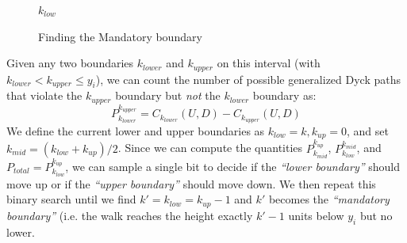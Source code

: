 \begin{figure}
\vspace{-3.0em}
\begin{framed}
    \renewcommand\figurename{Algorithm}
    \caption{Finding the Mandatory boundary}
    \label{alg:mandatory_boundary}
    \begin{algorithmic}[1]
                \vspace{.3em}
                \vspace{.3em}
                \vspace{.3em}
                \vspace{.3em}
            \EndWhile
            \State \Return $k_{low}$
        \EndFunction
    \end{algorithmic}
\end{framed}
\end{figure}
Given any two boundaries $k_{lower}$ and $k_{upper}$ on this interval (with $k_{lower} < k_{upper} \le y_i$),
we can count the number of possible generalized Dyck paths that violate the $k_{upper}$ boundary but \emph{not} the $k_{lower}$ boundary as:
\[
P_{k_{lower}}^{k_{upper}} = C_{k_{lower}}(U,D) - C_{k_{upper}}(U,D)
\]
We define the current lower and upper boundaries as $k_{low} = k, k_{up} = 0$, and set $k_{mid} = (k_{low} + k_{up})/2$.
Since we can compute the quantities $P_{k_{mid}}^{k_{up}}$, $P_{k_{low}}^{k_{mid}}$, and $P_{total} = P_{k_{low}}^{k_{up}}$,
we can sample a single bit to decide if the \emph{``lower boundary''} should move up or if the \emph{``upper boundary''} should move down.
We then repeat this binary search until we find $k' = k_{low} = k_{up}-1$ and $k'$ becomes the \emph{``mandatory boundary''}
(i.e. the walk reaches the height exactly $k'-1$ units below $y_i$ but no lower.



